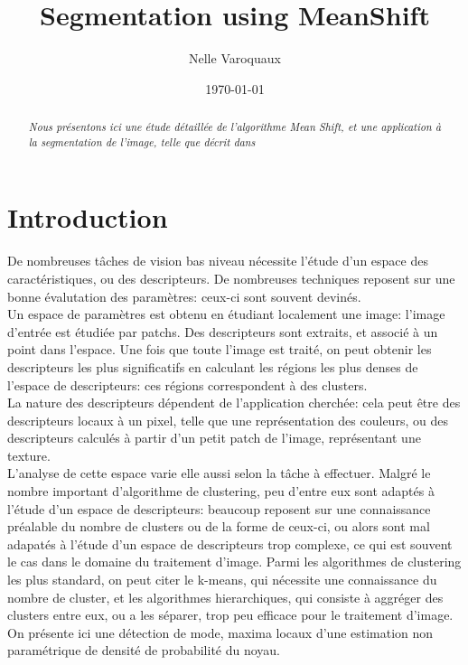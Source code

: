 \documentclass{article}
\date{\today}
\title{Segmentation using MeanShift}
\author{Nelle Varoquaux}
\begin{document}
\maketitle

\begin{abstract}
\textit{Nous présentons ici une étude détaillée de l'algorithme Mean Shift, et
une application à la segmentation de l'image, telle que décrit dans
\cite{my_article}}
\end{abstract}



\section{Introduction}

De nombreuses tâches de vision bas niveau nécessite l'étude d'un espace des
caractéristiques, ou des descripteurs. De nombreuses techniques reposent sur
une bonne évalutation des paramètres: ceux-ci sont souvent devinés. \\
Un espace de paramètres est obtenu en étudiant localement une image: l'image
d'entrée est étudiée par patchs. Des descripteurs sont extraits, et associé à
un point dans l'espace. Une fois que toute l'image est traité, on peut obtenir
les descripteurs les plus significatifs en calculant les régions les plus
denses de l'espace de descripteurs: ces régions correspondent à des clusters.
\\
La nature des descripteurs dépendent de l'application cherchée: cela peut
être des descripteurs locaux à un pixel, telle que une représentation des
couleurs, ou des descripteurs calculés à partir d'un petit patch de l'image,
représentant une texture. \\
L'analyse de cette espace varie elle aussi selon la tâche à effectuer. Malgré
le nombre important d'algorithme de clustering, peu d'entre eux sont adaptés à
l'étude d'un espace de descripteurs: beaucoup reposent sur une
connaissance préalable du nombre de clusters ou de la forme de ceux-ci, ou
alors sont mal adapatés à l'étude d'un espace de descripteurs trop complexe,
ce qui est souvent le cas dans le domaine du traitement d'image. Parmi les
algorithmes de clustering les plus standard, on peut citer le k-means, qui
nécessite une connaissance du nombre de cluster, et les algorithmes
hierarchiques, qui consiste à aggréger des clusters entre eux, ou a les
séparer, trop peu efficace pour le traitement d'image. \\
On présente ici une détection de mode, maxima locaux d'une estimation non
paramétrique de densité de probabilité du noyau.
\end{document}
